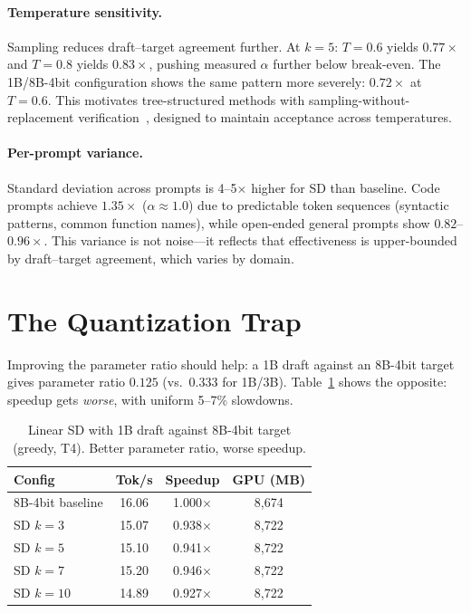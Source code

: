 \documentclass[letterpaper,twocolumn,10pt]{article}
\begin{document}
\paragraph{Temperature sensitivity.}
Sampling reduces draft--target agreement further.
At $k{=}5$: $T{=}0.6$ yields $0.77\times$ and $T{=}0.8$ yields $0.83\times$, pushing measured $\alpha$ further below break-even.
The 1B/8B-4bit configuration shows the same pattern more severely: $0.72\times$ at $T{=}0.6$.
This motivates tree-structured methods with sampling-without-replacement verification~\cite{chen2024sequoia}, designed to maintain acceptance across temperatures.

\paragraph{Per-prompt variance.}
Standard deviation across prompts is 4--5$\times$ higher for SD than baseline.
Code prompts achieve $1.35\times$ ($\alpha \approx 1.0$) due to predictable token sequences (syntactic patterns, common function names), while open-ended general prompts show $0.82$--$0.96\times$.
This variance is not noise---it reflects that effectiveness is upper-bounded by draft--target agreement, which varies by domain.


\section{The Quantization Trap}
\label{sec:quant}

Improving the parameter ratio should help: a 1B draft against an 8B-4bit target gives parameter ratio $0.125$ (vs.\ $0.333$ for 1B/3B).
Table~\ref{tab:quant} shows the opposite: speedup gets \emph{worse}, with uniform 5--7\% slowdowns.

\begin{table}[t]
\centering
\small
\caption{Linear SD with 1B draft against 8B-4bit target (greedy, T4). Better parameter ratio, worse speedup.}
\label{tab:quant}
\smallskip
\begin{tabular}{@{}lccc@{}}
\toprule
Config & Tok/s & Speedup & GPU (MB) \\
\midrule
8B-4bit baseline & 16.06 & 1.000$\times$ & 8{,}674 \\
SD $k{=}3$       & 15.07 & 0.938$\times$ & 8{,}722 \\
SD $k{=}5$       & 15.10 & 0.941$\times$ & 8{,}722 \\
SD $k{=}7$       & 15.20 & 0.946$\times$ & 8{,}722 \\
SD $k{=}10$      & 14.89 & 0.927$\times$ & 8{,}722 \\
\bottomrule
\end{tabular}
\end{table}
\end{document}
